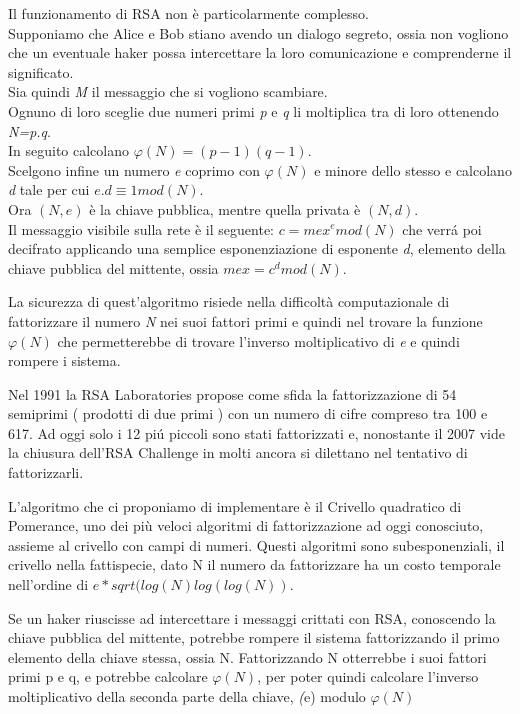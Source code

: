 Il funzionamento di RSA non è particolarmente complesso. \\
Supponiamo che Alice e Bob stiano avendo un dialogo segreto, ossia non vogliono che un eventuale haker possa intercettare la loro comunicazione e comprenderne il significato. \\
Sia quindi \emph{M} il messaggio che si vogliono scambiare.  \\
Ognuno di loro sceglie due numeri primi \emph{p} e \emph{q} li moltiplica tra di loro ottenendo \emph{N=p.q}. \\
In seguito calcolano $\varphi( N)  = ( p-1)(q-1)$. \\
Scelgono infine un numero \emph{e} coprimo con $\varphi(N)$ e minore dello stesso e calcolano \emph{d} tale per cui $e.d\equiv 1 mod(N)$. \\
Ora $(N, e)$ è la chiave pubblica, mentre quella privata è $(N, d)$. \\
Il messaggio visibile sulla rete è il seguente: $c=mex^e mod(N)$ che verr\'{a} poi decifrato applicando una semplice esponenziazione di esponente \emph{d}, elemento della chiave pubblica del mittente, ossia $mex=c^d mod(N)$.

La sicurezza di quest'algoritmo risiede nella difficoltà computazionale di fattorizzare il numero \emph{N} nei suoi fattori primi e quindi nel trovare la funzione $\varphi(N)$
che permetterebbe di trovare l'inverso moltiplicativo di \emph{e} e quindi rompere i sistema.

Nel 1991 la RSA Laboratories propose come sfida la fattorizzazione di 54 semiprimi ( prodotti di due primi ) con un numero di cifre compreso tra 100 e 617.
Ad oggi solo i 12 pi\'{u} piccoli sono stati fattorizzati e, nonostante il 2007 vide la chiusura dell'RSA Challenge in molti ancora si dilettano nel tentativo di fattorizzarli.

L'algoritmo che ci proponiamo di implementare è il Crivello quadratico di Pomerance, uno dei più veloci algoritmi di fattorizzazione ad oggi conosciuto, assieme al crivello con campi di numeri.
Questi algoritmi sono subesponenziali, il crivello nella fattispecie, dato N il numero da fattorizzare ha un costo temporale nell'ordine di $e*sqrt(log(N)log(log(N))$.

Se un haker riuscisse ad intercettare i messaggi crittati con RSA, conoscendo la chiave pubblica del mittente,
potrebbe rompere il sistema fattorizzando il primo elemento della chiave stessa, ossia N.
Fattorizzando N otterrebbe i suoi fattori primi p e q, e potrebbe calcolare $\varphi(N)$, per poter quindi calcolare l'inverso moltiplicativo della seconda parte della chiave, \emph(e) modulo $\varphi(N)$